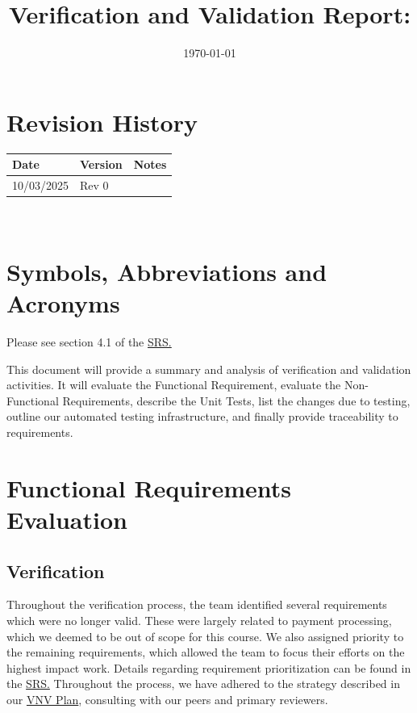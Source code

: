 \documentclass[12pt, titlepage]{article}
\begin{document}
\title{Verification and Validation Report: \progname} 
\author{\authname}
\date{\today}
	
\maketitle


\section{Revision History}

\begin{tabularx}{\textwidth}{p{3cm}p{2cm}X}
\toprule {\bf Date} & {\bf Version} & {\bf Notes}\\
\midrule
10/03/2025 & Rev 0 & \\
\bottomrule
\end{tabularx}

~\newpage

\section{Symbols, Abbreviations and Acronyms}

Please see section 4.1 of the \href{https://github.com/OKKM-insights/OKKM.insights/blob/main/docs/SRS/SRS.pdf}{SRS.}

\newpage

\tableofcontents

\listoftables %

\listoffigures %

\newpage


This document will provide a summary and analysis of verification and validation activities. It will evaluate the Functional Requirement, evaluate the Non-Functional Requirements,
describe the Unit Tests, list the changes due to testing, outline our automated testing infrastructure, and finally provide traceability to requirements.

\section{Functional Requirements Evaluation}
\subsection{Verification}
Throughout the verification process, the team identified several requirements which were no longer valid. These were largely related to payment processing, which we deemed to be out of scope for this course. We also assigned priority to the remaining 
requirements, which allowed the team to focus their efforts on the highest impact work. Details regarding requirement prioritization can be found in the \href{https://github.com/OKKM-insights/OKKM.insights/blob/main/docs/SRS/SRS.pdf}{SRS.} Throughout the process, we have adhered to the strategy described in our \href{https://github.com/OKKM-insights/OKKM.insights/blob/main/docs/VnVPlan/VnVPlan.pdf}{VNV Plan},
consulting with our peers and primary reviewers. 
\end{document}
